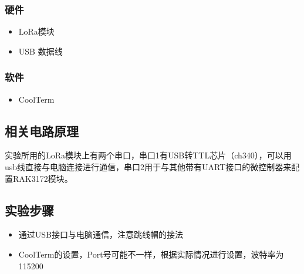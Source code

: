 \documentclass[a4paper,12pt,english]{sphinxmanual}
\begin{document}
{{\subsubsection{硬件}
\label{\detokenize{exp-lora/at-command:id3}}\begin{itemize}
\item {} 
\sphinxAtStartPar
LoRa模块

\item {} 
\sphinxAtStartPar
USB 数据线

\end{itemize}


\subsubsection{软件}
\label{\detokenize{exp-lora/at-command:id4}}\begin{itemize}
\item {} 
\sphinxAtStartPar
CoolTerm

\end{itemize}


\subsection{相关电路原理}
\label{\detokenize{exp-lora/at-command:id5}}
\sphinxAtStartPar
实验所用的LoRa模块上有两个串口，串口1有USB转TTL芯片（ch340），可以用usb线直接与电脑连接进行通信，串口2用于与其他带有UART接口的微控制器来配置RAK3172模块。


\subsection{实验步骤}
\label{\detokenize{exp-lora/at-command:id6}}\begin{itemize}
\item {} 
\sphinxAtStartPar
通过USB接口与电脑通信，注意跳线帽的接法

\end{itemize}

\sphinxAtStartPar
{}
\begin{itemize}
\item {} 
\sphinxAtStartPar
CoolTerm的设置，Port号可能不一样，根据实际情况进行设置，波特率为115200

\end{itemize}

\sphinxAtStartPar
{}

\sphinxAtStartPar
{}
\begin{quote}


\end{quote}}}
\end{document}
